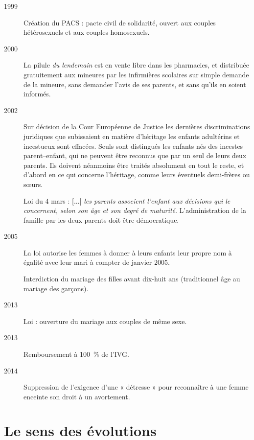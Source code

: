 \begin{description}
\item[1999] Création du PACS : pacte civil de solidarité, ouvert aux couples hétérosexuels et aux couples homosexuels.

\item[2000] La pilule {\emph{du lendemain}} est en vente libre dans les pharmacies, et distribuée gratuitement aux mineures par les infirmières scolaires sur simple demande de la mineure, sans demander l'avis de ses parents, et sans qu'ils en soient informés.

\item[2002] Sur décision de la Cour Européenne de Justice les dernières discriminations juridiques que subissaient en matière d'héritage les enfants adultérins et incestueux sont effacées. Seuls sont distingués les enfants nés des incestes parent--enfant, qui ne peuvent être reconnus que par un seul de leurs deux parents. Ils doivent néanmoins être traités absolument en tout le reste, et d'abord en ce qui concerne l'héritage, comme leurs éventuels demi-frères ou sœurs. 

Loi du 4 mars : {[...] \emph{les parents associent l'enfant aux décisions qui le concernent, selon son âge et son degré de maturité}}. L'administration de la famille par les deux parents doit être démocratique.

\item[2005] La loi autorise les femmes à donner à leurs enfants leur propre nom à égalité avec leur mari à compter de janvier 2005. 

Interdiction du mariage des filles avant dix-huit ans (traditionnel âge au mariage des garçons).

\item[2013] Loi  : ouverture du mariage aux couples de même sexe.

\item[2013] Remboursement à 100~\% de l'IVG.

\item[2014] Suppression de l'exigence d'une « détresse » pour reconnaître à une femme enceinte son droit à un avortement. 
\end{description}
 
 
\section{Le sens des évolutions}

